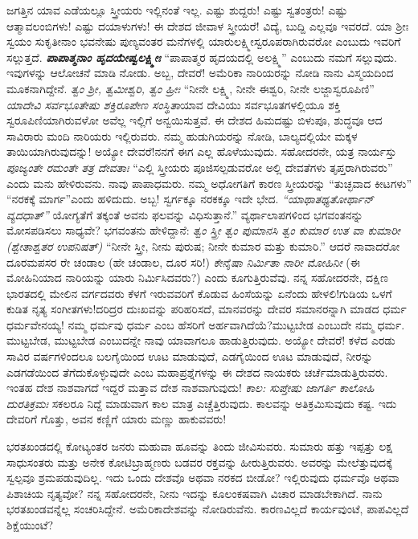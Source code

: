 ಜಗತ್ತಿನ ಯಾವ ಎಡೆಯಲ್ಲೂ ಸ್ತ್ರೀಯರು ಇಲ್ಲಿನಂತೆ ಇಲ್ಲ. ಎಷ್ಟು ಶುದ್ದರು! ಎಷ್ಟು ಸ್ವತಂತ್ರರು! ಎಷ್ಟು ಆತ್ಮಾವಲಂಬಿಗಳು! ಎಷ್ಟು ದಯಾಳುಗಳು! ಈ ದೇಶದ ಜೀವಾಳ ಸ್ತ್ರೀಯರೆ! ವಿದ್ಯೆ, ಬುದ್ದಿ ಎಲ್ಲವೂ ಇವರದೆ. ಯಾ ಶ‍್ರೀಃ ಸ್ವಯಂ ಸುಕೃತೀನಾಂ ಭವನೇಷು ಪುಣ್ಯವಂತರ ಮನೆಗಳಲ್ಲಿ ಯಾರುಲಕ್ಷ್ಮೀಸ್ವರೂಪರಾಗಿರುವರೋ ಎಂಬುದು ಇವರಿಗೆ ಸಲ್ಲುತ್ತದೆ. \textbf{\textit{ಪಾಪಾತ್ಮನಾಂ ಹೃದಯೇಷ್ವಲಕ್ಷ್ಮೀಃ}} “ಪಾಪಾತ್ಮರ ಹೃದಯದಲ್ಲಿ ಅಲಕ್ಷ್ಮಿ” ಎಂಬುದು ನಮಗೆ ಸಲ್ಲುವುದು. ಇವುಗಳನ್ನು ಆಲೋಚನೆ ಮಾಡಿ ನೋಡು. ಅಬ್ಬ, ದೇವರೆ! ಅಮೆರಿಕಾ ನಾರಿಯರನ್ನು ನೋಡಿ ನಾನು ವಿಸ್ಮಯದಿಂದ ಮೂಕನಾಗಿದ್ದೇನೆ. \textit{ತ್ವಂ ಶ‍್ರೀ, ತ್ವಮೀಶ್ವರಿ, ತ್ವಂ ಹ್ರೀಃ} “ನೀನೇ ಲಕ್ಷ್ಮಿ, ನೀನೇ ಈಶ್ವರಿ, ನೀನೇ ಲಜ್ಜಾಸ್ವರೂಪಿಣಿ” \textit{ಯಾದೇವಿ ಸರ್ವಭೂತೇಷು ಶಕ್ತಿರೂಪೇಣ ಸಂಸ್ಥಿತಾ}ಯಾವ ದೇವಿಯು ಸರ್ವಭೂತಗಳಲ್ಲಿಯೂ ಶಕ್ತಿ ಸ್ವರೂಪಿಣಿಯಾಗಿರುವಳೋ \enginline{-} ಅವೆಲ್ಲ ಇಲ್ಲಿಗೆ ಅನ್ವಯಿಸುತ್ತವೆ. ಈ ದೇಶದ ಹಿಮದಷ್ಟು ಬಿಳುಪೂ, ಶುದ್ಧವೂ ಆದ ಸಾವಿರಾರು ಮಂದಿ ನಾರಿಯರು ಇಲ್ಲಿರುವರು. ನಮ್ಮ ಹುಡುಗಿಯರನ್ನು ನೋಡಿ, ಬಾಲ್ಯದಲ್ಲಿಯೇ ಮಕ್ಕಳ ತಾಯಿಯಾಗಿರುವುದನ್ನು! ಅಯ್ಯೋ ದೇವರೆ!ನನಗೆ ಈಗ ಎಲ್ಲ ಹೊಳೆಯುವುದು. ಸಹೋದರನೇ, ಯತ್ರ ನಾರ್ಯಸ್ತು \textit{ಪೂಜ್ಯಂತೇ ರಮಂತೇ ತತ್ರ ದೇವತಾಃ} “ಎಲ್ಲಿ ಸ್ತ್ರೀಯರು ಪೂಜಿಸಲ್ಪಡುವರೋ ಅಲ್ಲಿ ದೇವತೆಗಳು ತೃಪ್ತರಾಗಿರುವರು” ಎಂದು ಮನು ಹೇಳಿರುವನು. ನಾವು ಪಾಪಾಧಮರು. ನಮ್ಮ ಅಧೋಗತಿಗೆ ಕಾರಣ ಸ್ತ್ರೀಯರನ್ನು “ತುಚ್ಛವಾದ ಕೀಟಗಳು” “ನರಕಕ್ಕೆ ಮಾರ್ಗ”ಎಂದು ಹಳಿದುದು. ಅಬ್ಬ! ಸ್ವರ್ಗಕ್ಕೂ ನರಕಕ್ಕೂ ಇದೇ ಭೇದ. \textit{ “ಯಾಥಾತಥ್ಯತೋರ್ಥಾನ್ ವ್ಯದಧಾತ್”} ಯೋಗ್ಯತೆಗೆ ತಕ್ಕಂತೆ ಅವನು ಫಲವನ್ನು ವಿಧಿಸುತ್ತಾನೆ.” ವ್ಯರ್ಥಾಲಾಪಗಳಿಂದ ಭಗವಂತನನ್ನು ಮೋಸಪಡಿಸಲು ಸಾಧ್ಯವೇ? ಭಗವಂತನು ಹೇಳಿದ್ದಾನೆ: \textit{ತ್ವಂ ಸ್ತ್ರೀ ತ್ವಂ ಪುಮಾನಸಿ ತ್ವಂ ಕುಮಾರ ಉತ ವಾ ಕುಮಾರೀ (ಶ್ವೇತಾಶ್ವತರ ಉಪನಿಷತ್)} “ನೀನೇ ಸ್ತ್ರೀ, ನೀನು ಪುರುಷ; ನೀನೇ ಕುಮಾರ ಮತ್ತು ಕುಮಾರಿ.” ಆದರೆ ನಾವಾದರೋ ದೂರಮಪಸರ ರೇ ಚಂಡಾಲ (ಹೇ ಚಂಡಾಲ, ದೂರ ಸರಿ!) \textit{ಕೇನೈಷಾ ನಿರ್ಮಿತಾ ನಾರೀ ಮೋಹಿನೀ} (ಈ ಮೋಹಿನಿಯಾದ ನಾರಿಯನ್ನು ಯಾರು ನಿರ್ಮಿಸಿದವರು?) ಎಂದು ಕೂಗುತ್ತಿರುವೆವು. ನನ್ನ ಸಹೋದರನೇ, ದಕ್ಷಿಣ ಭಾರತದಲ್ಲಿ ಮೇಲಿನ ವರ್ಗದವರು ಕೆಳಗೆ ಇರುವವರಿಗೆ ಕೊಡುವ ಹಿಂಸೆಯನ್ನು ಏನೆಂದು ಹೇಳಲಿ!ಗುಡಿಯ ಒಳಗೆ ಕುಡಿತ ನೃತ್ಯ ಸಂಗೀತಗಳು!ದರಿದ್ರರ ದುಃಖವನ್ನು ಪರಿಹರಿಸದೆ, ಮಾನವರನ್ನು ದೇವರ ಸಮಾನರನ್ನಾಗಿ ಮಾಡದ ಧರ್ಮ ಧರ್ಮವೇನಯ್ಯ! ನಮ್ಮ ಧರ್ಮವು ಧರ್ಮ ಎಂಬ ಹೆಸರಿಗೆ ಅರ್ಹವಾಗಿದೆಯೆ?ಮುಟ್ಟಬೇಡ ಎಂಬುದೇ ನಮ್ಮ ಧರ್ಮ. ಮುಟ್ಟಬೇಡ, ಮುಟ್ಟಬೇಡ ಎಂಬುದನ್ನೇ ನಾವು ಯಾವಾಗಲೂ ಹಾಡುತ್ತಿರುವುದು. ಅಯ್ಯೋ ದೇವರೆ! ಕಳೆದ ಎರಡು ಸಾವಿರ ವರ್ಷಗಳಿಂದಲೂ ಬಲಗೈಯಿಂದ ಊಟ ಮಾಡುವುದೆ, ಎಡಗೈಯಿಂದ ಊಟ ಮಾಡುವುದೆ, ನೀರನ್ನು ಎಡಗಡೆಯಿಂದ ತೆಗೆದುಕೊಳ್ಳುವುದೇ ಎಂಬ ಮಹಾಪ್ರಶ್ನೆಗಳನ್ನು ಈ ದೇಶದ ನಾಯಕರು ಚರ್ಚೆಮಾಡುತ್ತಿರುವರು. ಇಂತಹ ದೇಶ ನಾಶವಾಗದೆ ಇದ್ದರೆ ಮತ್ತಾವ ದೇಶ ನಾಶವಾಗುವುದು! \textit{ಕಾಲ: ಸುಪ್ತೇಷು ಜಾಗರ್ತಿ ಕಾಲೋಹಿ ದುರತಿಕ್ರಮಃ} ಸಕಲರೂ ನಿದ್ದೆ ಮಾಡುವಾಗ ಕಾಲ ಮಾತ್ರ ಎಚ್ಚೆತ್ತಿರುವುದು. ಕಾಲವನ್ನು ಅತಿಕ್ರಮಿಸುವುದು ಕಷ್ಟ. ಇದು ದೇವರಿಗೆ ಗೊತ್ತು, ಅವನ ಕಣ್ಣಿಗೆ ಯಾರು ಮಣ್ಣು ಹಾಕುವವರು!

ಭರತಖಂಡದಲ್ಲಿ ಕೋಟ್ಯಂತರ ಜನರು ಮಹುವಾ ಹೂವನ್ನು ತಿಂದು ಜೀವಿಸುವರು. ಸುಮಾರು ಹತ್ತು ಇಪ್ಪತ್ತು ಲಕ್ಷ ಸಾಧುಸಂತರು ಮತ್ತು ಅನೇಕ ಕೋಟಿಬ್ರಾಹ್ಮಣರು ಬಡವರ ರಕ್ತವನ್ನು ಹೀರುತ್ತಿರುವರು. ಅವರನ್ನು ಮೇಲೆತ್ತುವುದಕ್ಕೆ ಸ್ವಲ್ಪವೂ ಶ್ರಮಪಡುವುದಿಲ್ಲ. ಇದು ಒಂದು ದೇಶವೊ ಅಥವಾ ನರಕದ ಬೀಡೋ? ಇಲ್ಲಿರುವುದು ಧರ್ಮವೊ ಅಥವಾ ಪಿಶಾಚಿಯ ನೃತ್ಯವೋ? ನನ್ನ ಸಹೋದರನೇ, ನೀನು ಇದನ್ನು ಕೂಲಂಕಷವಾಗಿ ವಿಚಾರ ಮಾಡಬೇಕಾಗಿದೆ. ನಾನು ಭರತಖಂಡವನ್ನೆಲ್ಲ ಸಂಚರಿಸಿದ್ದೇನೆ. ಅಮೆರಿಕಾದೇಶವನ್ನು ನೋಡಿರುವೆನು. ಕಾರಣವಿಲ್ಲದೆ ಕಾರ್ಯವುಂಟೆ, ಪಾಪವಿಲ್ಲದೆ ಶಿಕ್ಷೆಯುಂಟೆ?

